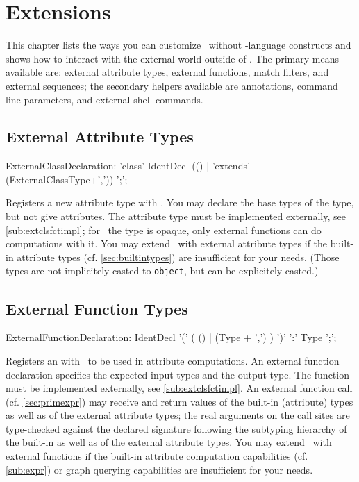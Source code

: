 \chapter{Extensions}\label{chapextensions}

This chapter lists the ways you can customize \GrG~without \GrG-language constructs and
shows how to interact with the external world outside of \GrG.
The primary means available are: external attribute types, external functions, match filters, and external sequences; the secondary helpers available are annotations, command line parameters, and external shell commands.

\section{External Attribute Types}\label{sub:extcls}
\begin{rail}
  ExternalClassDeclaration: 'class' IdentDecl (() | 'extends' (ExternalClassType+',')) ';';
\end{rail}
Registers a new attribute type with \GrG. You may declare the base types of the type, but not give attributes. The attribute type must be implemented externally, see \ref{sub:extclsfctimpl}; for \GrG~the type is opaque, only external functions can do computations with it. You may extend \GrG~with external attribute types if the built-in attribute types (cf. \ref{sec:builtintypes}) are insufficient for your needs.
(Those types are not implicitely casted to \texttt{object}, but can be explicitely casted.)

\section{External Function Types}\label{sub:extfct}
\begin{rail}
  ExternalFunctionDeclaration: IdentDecl '(' ( () | (Type + ',') ) ')' ':' Type ';';
\end{rail}
Registers an  with \GrG~to be used in attribute computations.
An external function declaration specifies the expected input types and the output type. The function must be implemented externally, see \ref{sub:extclsfctimpl}.
An external function call (cf. \ref{sec:primexpr}) may receive and return values of the built-in (attribute) types as well as of the external attribute types; the real arguments on the call sites are type-checked against the declared signature following the subtyping hierarchy of the built-in as well as of the external attribute types.
You may extend \GrG~with external functions if the built-in attribute computation capabilities (cf. \ref{sub:expr}) or graph querying capabilities are insufficient for your needs.

